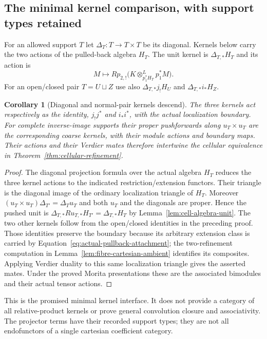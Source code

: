 \documentclass[11pt]{article}
\newtheorem{corollary}[theorem]{Corollary}
\theoremstyle{definition}
\theoremstyle{remark}
\begin{document}
\subsection{The minimal kernel comparison, with support types retained}
For an allowed support $T$ let $\Delta_T:T\to T\times T$ be its
diagonal.  Kernels below carry the two actions of the pulled-back
algebra $H_T$.  The unit kernel is $\Delta_{T,*}H_T$ and its action is
\[
 M\longmapsto Rp_{2,!}
 \bigl(K\otimes^L_{p_1^*H_T}p_1^*M\bigr).
\]
For an open/closed pair $T=U\sqcup Z$ use also
$\Delta_{T,*}j_!H_U$ and $\Delta_{T,*}i_*H_Z$.

\begin{corollary}[Diagonal and normal-pair kernels descend]
\label{cor:cell-kernels}
The three kernels act respectively as the identity, $j_!j^*$ and
$i_*i^*$, with the actual localization boundary.  For complete
inverse-image supports their proper pushforwards along
$u_T\times u_T$ are the corresponding coarse kernels, with their
module actions and boundary maps.  Their actions and their Verdier
mates therefore intertwine the cellular equivalence in
Theorem~\ref{thm:cellular-refinement}.
\end{corollary}
\begin{proof}
The diagonal projection formula over the actual algebra $H_T$ reduces
the three kernel actions to the indicated restriction/extension
functors.  Their triangle is the diagonal image of the ordinary
localization triangle of $H_T$.  Moreover
$(u_T\times u_T)\Delta_{T'}=\Delta_Tu_T$ and both $u_T$ and the
diagonals are proper.  Hence the pushed unit is
$\Delta_{T,*}Ru_{T,*}H_{T'}=\Delta_{T,*}H_T$ by
Lemma~\ref{lem:cell-algebra-unit}.  The two other kernels follow
from the open/closed identities in the preceding proof.  Those
identities preserve the boundary because its arbitrary extension
class is carried by Equation~\eqref{eq:actual-pullback-attachment};
the two-refinement computation in Lemma~\ref{lem:fibre-cartesian-ambient}
identifies its composites.  Applying Verdier duality to this same
localization triangle gives the asserted mates.
Under the proved Morita presentations these are the associated
bimodules and their actual tensor actions.
\end{proof}
This is the promised minimal kernel interface.  It does not provide a
category of all relative-product kernels or prove general convolution
closure and associativity.  The projector terms have their recorded
support types; they are not all endofunctors of a single cartesian
coefficient category.
\end{document}
